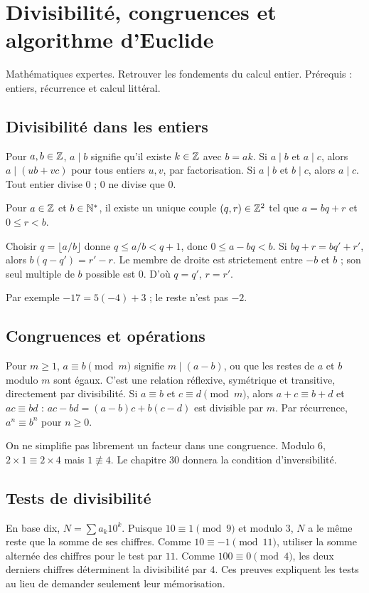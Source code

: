 \documentclass[../cours_tle.tex]{subfiles}
\begin{document}
\setcounter{chapter}{28}
\chapter{Divisibilité, congruences et algorithme d’Euclide}
\label{ch:29}
\begin{objectif}
Mathématiques expertes. Retrouver les fondements du calcul entier. Prérequis : entiers, récurrence et calcul littéral.
\end{objectif}
\section{Divisibilité dans les entiers}
Pour $a,b\in\mathbb{Z}$, $a\mid b$ signifie qu'il existe $k\in\mathbb{Z}$ avec $b=ak$.
Si $a\mid b$ et $a\mid c$, alors $a\mid(ub+vc)$ pour tous entiers $u,v$, par factorisation.
Si $a\mid b$ et $b\mid c$, alors $a\mid c$. Tout entier divise $0$ ; $0$ ne divise que $0$.
\begin{theoreme}
Pour $a\in\mathbb{Z}$ et $b\in\mathbb{N}^*$, il existe un unique couple $(q,r)\in\mathbb{Z}^2$ tel que $a=bq+r$ et $0\le r<b$.
\end{theoreme}
\begin{demonstration}
Choisir $q=\lfloor a/b\rfloor$ donne $q\le a/b<q+1$, donc $0\le a-bq<b$.
Si $bq+r=bq'+r'$, alors $b(q-q')=r'-r$. Le membre de droite est strictement entre $-b$ et $b$ ; son seul multiple de $b$ possible est $0$. D'où $q=q'$, $r=r'$.
\end{demonstration}
Par exemple $-17=5(-4)+3$ ; le reste n'est pas $-2$.
\section{Congruences et opérations}
Pour $m\ge1$, $a\equiv b\pmod m$ signifie $m\mid(a-b)$, ou que les restes de $a$ et $b$ modulo $m$ sont égaux.
C'est une relation réflexive, symétrique et transitive, directement par divisibilité.
Si $a\equiv b$ et $c\equiv d\pmod m$, alors $a+c\equiv b+d$ et $ac\equiv bd$ :
$ac-bd=(a-b)c+b(c-d)$ est divisible par $m$.
Par récurrence, $a^n\equiv b^n$ pour $n\ge0$.
\begin{attention}
On ne simplifie pas librement un facteur dans une congruence. Modulo $6$, $2\times1\equiv2\times4$ mais $1\not\equiv4$. Le chapitre 30 donnera la condition d'inversibilité.
\end{attention}
\section{Tests de divisibilité}
En base dix, $N=\sum a_k10^k$. Puisque $10\equiv1\pmod9$ et modulo $3$, $N$ a le même reste que la somme de ses chiffres.
Comme $10\equiv-1\pmod{11}$, utiliser la somme alternée des chiffres pour le test par $11$.
Comme $100\equiv0\pmod4$, les deux derniers chiffres déterminent la divisibilité par $4$.
Ces preuves expliquent les tests au lieu de demander seulement leur mémorisation.
\end{document}
